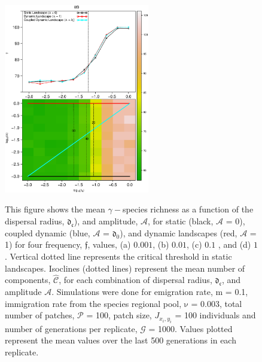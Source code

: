 \documentclass[12pt]{article}
\begin{document}
\begin{figure}[hb!]
\begin{center}
\includegraphics[width=2.5in]{./figures/new_A_r0_MeanGamma_010.eps}\\
\end{center}
\caption{This figure shows the mean $\gamma-$species richness as a function of the dispersal radius, $\mathfrak{d_{c}}$), and amplitude, $\mathcal{A}$, for static (black, $\mathcal{A}$ = 0), coupled dynamic (blue, $\mathcal{A}$ = $\mathfrak{d_{0}}$), and dynamic landscapes (red, $\mathcal{A}$ = 1) for four frequency, $\mathfrak{f}$, values, (a) $0.001$, (b) $0.01$, (c) $0.1$ , and (d) $1$. Vertical dotted line represents the critical threshold in static landscapes. Isoclines (dotted lines) represent the mean number of components, $\hat{\mathcal{C}}$, for each combination of dispersal radius, $\mathfrak{d_{c}}$, and amplitude $\mathcal{A}$. Simulations were done for emigration rate, $\mathrm{m}$ = 0.1, immigration rate from the species regional pool, $\mathrm{\nu}$ = 0.003, total number of patches, $\mathcal{P}$ = 100, patch size, $J_{x_i,y_i}$ = 100 individuals and number of generations per replicate, $\mathcal{G}$ = 1000. Values plotted represent the mean values over the last 500 generations in each replicate.}
\label{fig:SI-D1}
\end{figure}
\end{document}
